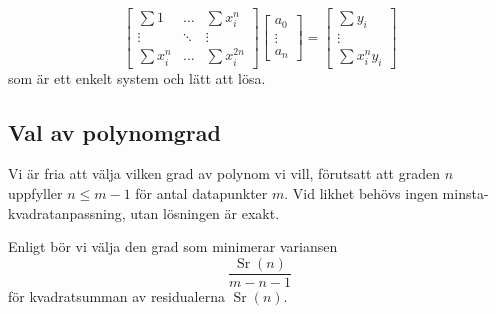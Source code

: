 \begin{equation}
\begin{bmatrix}
\sum 1 & \dots & \sum x_i^n \\
\vdots & \ddots & \vdots \\
\sum x_i^n & \dots & \sum x_i^{2n}
\end{bmatrix}
\begin{bmatrix}
a_0 \\
\vdots \\
a_n
\end{bmatrix} = \begin{bmatrix}
\sum y_i \\
\vdots \\
\sum x_i^n y_i
\end{bmatrix}
\label{eqn:ls}
\end{equation}
som är ett enkelt system och lätt att lösa.

\subsection{Val av polynomgrad}

Vi är fria att välja vilken grad av polynom vi vill, förutsatt att graden $n$ uppfyller $n \leq m-1$ för antal datapunkter $m$. Vid likhet behövs ingen minsta-kvadratanpassning, utan lösningen är exakt.

Enligt \cite{ref:kaw} bör vi välja den grad som minimerar variansen
\begin{equation}
\frac{\operatorname{Sr}(n)}{m-n-1}
\label{eqn:kaw}
\end{equation}
för kvadratsumman av residualerna $\operatorname{Sr}(n)$.

